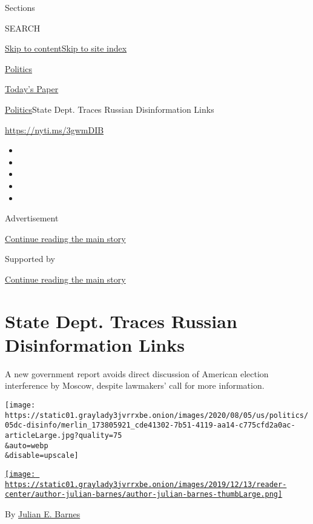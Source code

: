 Sections

SEARCH

\protect\hyperlink{site-content}{Skip to
content}\protect\hyperlink{site-index}{Skip to site index}

\href{https://www.nytimes3xbfgragh.onion/section/politics}{Politics}

\href{https://myaccount.nytimes3xbfgragh.onion/auth/login?response_type=cookie\&client_id=vi}{}

\href{https://www.nytimes3xbfgragh.onion/section/todayspaper}{Today's
Paper}

\href{/section/politics}{Politics}\textbar{}State Dept. Traces Russian
Disinformation Links

\url{https://nyti.ms/3gwmDIB}

\begin{itemize}
\item
\item
\item
\item
\item
\end{itemize}

Advertisement

\protect\hyperlink{after-top}{Continue reading the main story}

Supported by

\protect\hyperlink{after-sponsor}{Continue reading the main story}

\hypertarget{state-dept-traces-russian-disinformation-links}{%
\section{State Dept. Traces Russian Disinformation
Links}\label{state-dept-traces-russian-disinformation-links}}

A new government report avoids direct discussion of American election
interference by Moscow, despite lawmakers' call for more information.

\texttt{[image: https://static01.graylady3jvrrxbe.onion/images/2020/08/05/us/politics/05dc-disinfo/merlin\_173805921\_cde41302-7b51-4119-aa14-c775cfd2a0ac-articleLarge.jpg?quality=75\\\&auto=webp\\\&disable=upscale]}

\href{https://www.nytimes3xbfgragh.onion/by/julian-e-barnes}{\texttt{[image: https://static01.graylady3jvrrxbe.onion/images/2019/12/13/reader-center/author-julian-barnes/author-julian-barnes-thumbLarge.png]}}

By \href{https://www.nytimes3xbfgragh.onion/by/julian-e-barnes}{Julian
E. Barnes}

